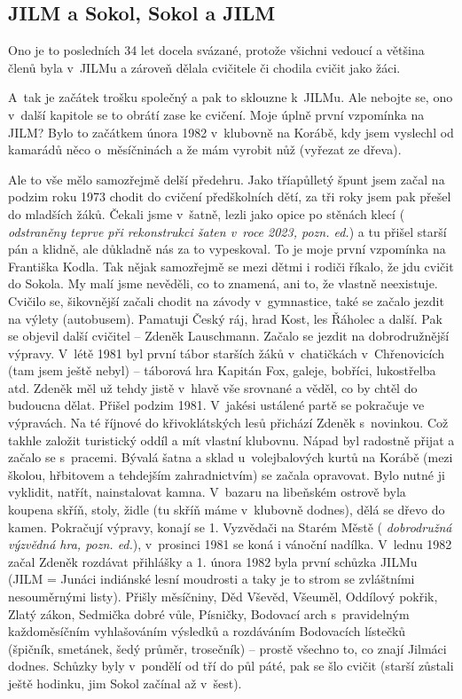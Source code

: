 \documentclass[a5paper, 11pt, twoside]{article}
\newcommand{\pozned}[1]{%
\textit{#1}}
\begin{document}
\subsection{JILM a Sokol, Sokol a JILM}

Ono je to posledních 34 let docela svázané, protože všichni vedoucí a
většina členů byla v~JILMu a zároveň dělala cvičitele či chodila cvičit
jako žáci.

A~tak je začátek trošku společný a pak to sklouzne k~JILMu. Ale nebojte
se, ono v~další kapitole se to obrátí zase ke cvičení. Moje úplně první
vzpomínka na JILM? Bylo to začátkem února 1982 v~klubovně na Korábě, kdy
jsem vyslechl od kamarádů něco o~měsíčninách a že mám vyrobit nůž
(vyřezat ze dřeva).

Ale to vše mělo samozřejmě delší předehru. Jako tříapůlletý špunt jsem
začal na podzim roku 1973 chodit do cvičení předškolních dětí, za tři
roky jsem pak přešel do mladších žáků. Čekali jsme v~šatně, lezli jako
opice po stěnách klecí (\pozned{odstraněny teprve při rekonstrukci šaten
v~roce 2023, pozn. ed.}) a tu přišel starší pán a klidně, ale důkladně nás
za to vypeskoval. To je moje první vzpomínka na Františka Kodla. Tak
nějak samozřejmě se mezi dětmi i rodiči říkalo, že jdu cvičit do Sokola.
My malí jsme nevěděli, co to znamená, ani to, že vlastně neexistuje.
Cvičilo se, šikovnější začali chodit na závody v~gymnastice, také se
začalo jezdit na výlety (autobusem). Pamatuji Český ráj, hrad Kost, les
Řáholec a další. Pak se objevil další cvičitel -- Zdeněk Lauschmann.
Začalo se jezdit na dobrodružnější výpravy. V~létě 1981 byl první tábor
starších žáků v~chatičkách v~Chřenovicích (tam jsem ještě nebyl) --
táborová hra Kapitán Fox, galeje, bobříci, lukostřelba atd. Zdeněk měl
už tehdy jistě v~hlavě vše srovnané a věděl, co by chtěl do budoucna
dělat. Přišel podzim 1981. V~jakési ustálené partě se pokračuje ve
výpravách. Na té říjnové do křivoklátských lesů přichází Zdeněk
s~novinkou. Což takhle založit turistický oddíl a mít vlastní klubovnu.
Nápad byl radostně přijat a začalo se s~pracemi. Bývalá šatna a sklad
u~volejbalových kurtů na Korábě (mezi školou, hřbitovem a tehdejším
zahradnictvím) se začala opravovat. Bylo nutné ji vyklidit, natřít,
nainstalovat kamna. V~bazaru na libeňském ostrově byla koupena skříň,
stoly, židle (tu skříň máme v~klubovně dodnes), dělá se dřevo do kamen.
Pokračují výpravy, konají se 1. Vyzvědači na Starém Městě
(\pozned{dobrodružná výzvědná hra, pozn. ed.}), v~prosinci 1981 se koná i
vánoční nadílka. V~lednu 1982 začal Zdeněk rozdávat přihlášky a 1. února
1982 byla první schůzka JILMu (JILM = Junáci indiánské lesní moudrosti a
taky je to strom se zvláštními nesouměrnými listy). Přišly měsíčniny,
Děd Vševěd, Všeuměl, Oddílový pokřik, Zlatý zákon, Sedmička dobré vůle,
Písničky, Bodovací arch s~pravidelným každoměsíčním vyhlašováním
výsledků a rozdáváním Bodovacích lístečků (špičník, smetánek, šedý
průměr, trosečník) -- prostě všechno to, co znají Jilmáci dodnes.
Schůzky byly v~pondělí od tří do půl páté, pak se šlo cvičit (starší
zůstali ještě hodinku, jim Sokol začínal až v~šest).
\end{document}
